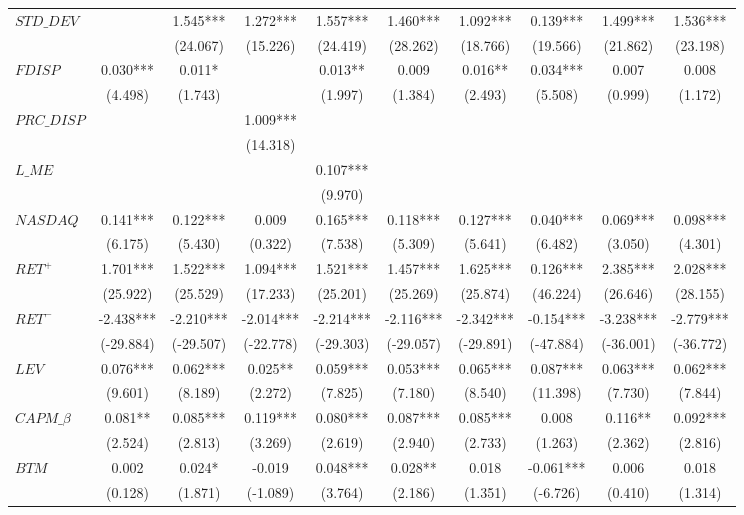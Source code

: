 \documentclass[
  12pt,
  a4paper,
  twoside,
  onecolumn]{article}
\begin{document}
\begin{landscape}
\begin{spacing}{1.0}
\begin{xltabular}{\linewidth}{X * {9}{S[table-format=5.3]}}
\endfoot
\bottomrule
\endlastfoot
$STD\_DEV$ &  & 1.545*** & 1.272*** & 1.557*** & 1.460*** & 1.092*** & 0.139*** & 1.499*** & 1.536***\\
 &  & (24.067) & (15.226) & (24.419) & (28.262) & (18.766) & (19.566) & (21.862) & (23.198)\\
\addlinespace
$FDISP$ & 0.030*** & 0.011* &  & 0.013** & 0.009 & 0.016** & 0.034*** & 0.007 & 0.008\\
 & (4.498) & (1.743) &  & (1.997) & (1.384) & (2.493) & (5.508) & (0.999) & (1.172)\\
\addlinespace
$PRC\_DISP$ &  &  & 1.009*** &  &  &  &  &  & \\
 &  &  & (14.318) &  &  &  &  &  & \\
\addlinespace
$L\_ME$ &  &  &  & 0.107*** &  &  &  &  & \\
 &  &  &  & (9.970) &  &  &  &  & \\
\addlinespace
$NASDAQ$ & 0.141*** & 0.122*** & 0.009 & 0.165*** & 0.118*** & 0.127*** & 0.040*** & 0.069*** & 0.098***\\
 & (6.175) & (5.430) & (0.322) & (7.538) & (5.309) & (5.641) & (6.482) & (3.050) & (4.301)\\
\addlinespace
$RET^+$ & 1.701*** & 1.522*** & 1.094*** & 1.521*** & 1.457*** & 1.625*** & 0.126*** & 2.385*** & 2.028***\\
 & (25.922) & (25.529) & (17.233) & (25.201) & (25.269) & (25.874) & (46.224) & (26.646) & (28.155)\\
\addlinespace
$RET^-$ & -2.438*** & -2.210*** & -2.014*** & -2.214*** & -2.116*** & -2.342*** & -0.154*** & -3.238*** & -2.779***\\
 & (-29.884) & (-29.507) & (-22.778) & (-29.303) & (-29.057) & (-29.891) & (-47.884) & (-36.001) & (-36.772)\\
\addlinespace
$LEV$ & 0.076*** & 0.062*** & 0.025** & 0.059*** & 0.053*** & 0.065*** & 0.087*** & 0.063*** & 0.062***\\
 & (9.601) & (8.189) & (2.272) & (7.825) & (7.180) & (8.540) & (11.398) & (7.730) & (7.844)\\
\addlinespace
$CAPM\_\beta$ & 0.081** & 0.085*** & 0.119*** & 0.080*** & 0.087*** & 0.085*** & 0.008 & 0.116** & 0.092***\\
 & (2.524) & (2.813) & (3.269) & (2.619) & (2.940) & (2.733) & (1.263) & (2.362) & (2.816)\\
\addlinespace
$BTM$ & 0.002 & 0.024* & -0.019 & 0.048*** & 0.028** & 0.018 & -0.061*** & 0.006 & 0.018\\
 & (0.128) & (1.871) & (-1.089) & (3.764) & (2.186) & (1.351) & (-6.726) & (0.410) & (1.314)\\

\end{xltabular}
\end{spacing}
\end{landscape}
\end{document}
